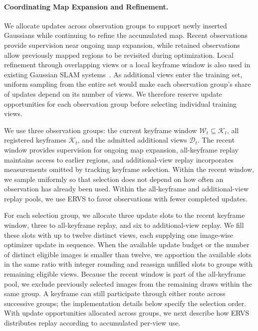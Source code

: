 \paragraph{Coordinating Map Expansion and Refinement.}
We allocate updates across observation groups to support newly inserted Gaussians while continuing to refine the accumulated map.
Recent observations provide supervision near ongoing map expansion, while retained observations allow previously mapped regions to be revisited during optimization.
Local refinement through overlapping views or a local keyframe window is also used in existing Gaussian SLAM systems~\cite{splatam2024,splatslam2024}.
As additional views enter the training set, uniform sampling from the entire set would make each observation group's share of updates depend on its number of views.
We therefore reserve update opportunities for each observation group before selecting individual training views.

We use three observation groups: the current keyframe window $\mathcal W_t\subseteq\mathcal K_t$, all registered keyframes $\mathcal K_t$, and the admitted additional views $\mathcal D_t$.
The recent window provides supervision for ongoing map expansion, all-keyframe replay maintains access to earlier regions, and additional-view replay incorporates measurements omitted by tracking keyframe selection.
Within the recent window, we sample uniformly so that selection does not depend on how often an observation has already been used.
Within the all-keyframe and additional-view replay pools, we use ERVS to favor observations with fewer completed updates.

For each selection group, we allocate three update slots to the recent keyframe window, three to all-keyframe replay, and six to additional-view replay.
We fill these slots with up to twelve distinct views, each supplying one image-wise optimizer update in sequence.
When the available update budget or the number of distinct eligible images is smaller than twelve, we apportion the available slots in the same ratio with integer rounding and reassign unfilled slots to groups with remaining eligible views.
Because the recent window is part of the all-keyframe pool, we exclude previously selected images from the remaining draws within the same group.
A keyframe can still participate through either route across successive groups; the implementation details below specify the selection order.
With update opportunities allocated across groups, we next describe how ERVS distributes replay according to accumulated per-view use.

